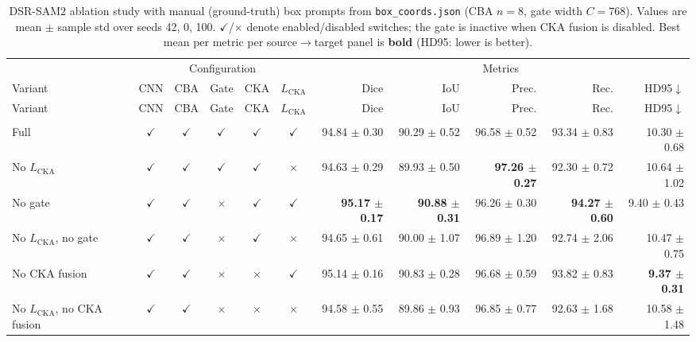 \documentclass[10pt]{article}
\begin{document}
{\scriptsize
\setlength{\tabcolsep}{2pt}
\begin{longtable}{lccccc rrrrr}
\caption{DSR-SAM2 ablation study with manual (ground-truth) box prompts from \texttt{box\_coords.json} (CBA $n=8$, gate width $C=768$). Values are mean $\pm$ sample std over seeds 42, 0, 100. $\checkmark$/$\times$ denote enabled/disabled switches; the gate is inactive when CKA fusion is disabled. Best mean per metric per source$\rightarrow$target panel is \textbf{bold} (HD95: lower is better).}
\label{tab:ablation_dsr_sam2_manual}\\
\toprule
& \multicolumn{5}{c}{Configuration} & \multicolumn{5}{c}{Metrics} \\
\cmidrule(lr){2-6}\cmidrule(lr){7-11}
Variant & CNN & CBA & Gate & CKA & $L_{\mathrm{CKA}}$ & Dice & IoU & Prec. & Rec. & HD95$\downarrow$ \\
\midrule
\endfirsthead
\toprule
Variant & CNN & CBA & Gate & CKA & $L_{\mathrm{CKA}}$ & Dice & IoU & Prec. & Rec. & HD95$\downarrow$ \\
\midrule
\endhead
\endfoot
\bottomrule
\endlastfoot
\multicolumn{11}{l}{\textit{Source: OTU $\rightarrow$ Target: OVATUS}} \\
\midrule
Full & $\checkmark$ & $\checkmark$ & $\checkmark$ & $\checkmark$ & $\checkmark$ & 94.84 $\pm$ 0.30 & 90.29 $\pm$ 0.52 & 96.58 $\pm$ 0.52 & 93.34 $\pm$ 0.83 & 10.30 $\pm$ 0.68 \\
No $L_{\mathrm{CKA}}$ & $\checkmark$ & $\checkmark$ & $\checkmark$ & $\checkmark$ & $\times$ & 94.63 $\pm$ 0.29 & 89.93 $\pm$ 0.50 & \textbf{97.26 $\pm$ 0.27} & 92.30 $\pm$ 0.72 & 10.64 $\pm$ 1.02 \\
No gate & $\checkmark$ & $\checkmark$ & $\times$ & $\checkmark$ & $\checkmark$ & \textbf{95.17 $\pm$ 0.17} & \textbf{90.88 $\pm$ 0.31} & 96.26 $\pm$ 0.30 & \textbf{94.27 $\pm$ 0.60} & 9.40 $\pm$ 0.43 \\
No $L_{\mathrm{CKA}}$, no gate & $\checkmark$ & $\checkmark$ & $\times$ & $\checkmark$ & $\times$ & 94.65 $\pm$ 0.61 & 90.00 $\pm$ 1.07 & 96.89 $\pm$ 1.20 & 92.74 $\pm$ 2.06 & 10.47 $\pm$ 0.75 \\
No CKA fusion & $\checkmark$ & $\checkmark$ & $\times$ & $\times$ & $\checkmark$ & 95.14 $\pm$ 0.16 & 90.83 $\pm$ 0.28 & 96.68 $\pm$ 0.59 & 93.82 $\pm$ 0.83 & \textbf{9.37 $\pm$ 0.31} \\
No $L_{\mathrm{CKA}}$, no CKA fusion & $\checkmark$ & $\checkmark$ & $\times$ & $\times$ & $\times$ & 94.58 $\pm$ 0.55 & 89.86 $\pm$ 0.93 & 96.85 $\pm$ 0.77 & 92.63 $\pm$ 1.68 & 10.58 $\pm$ 1.48 \\

\end{longtable}}
\end{document}
